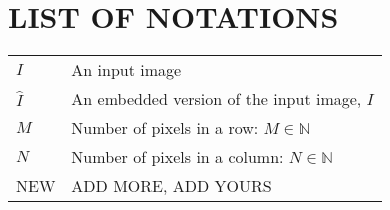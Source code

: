 \chapter{LIST OF NOTATIONS}
\noindent
\begin{longtable}[l]{p{60pt}p{300pt}}

$I$ 	       &   An input image \\
$\hat{I}$      &   An embedded version of the input image, $I$ \\ 
$M$ 	       &   Number of pixels in a row: $M \in \mathbb{N}$\\
$N$ 	 	   &   Number of pixels in a column: $N \in \mathbb{N}$ \\
NEW & ADD MORE, ADD YOURS\\
\end{longtable}


